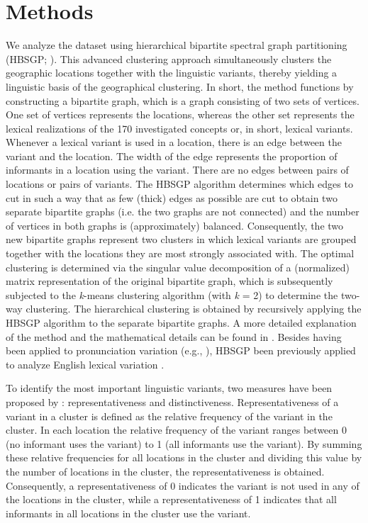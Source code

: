 \documentclass[output=paper]{LSP/langsci}
\begin{document}
\section{Methods}
We analyze the dataset using hierarchical bipartite spectral graph partitioning (HBSGP; \citealt{wieling_bipartite_2011}). This advanced clustering approach simultaneously clusters the geographic locations together with the linguistic variants, thereby yielding a linguistic basis of the geographical clustering. In short, the method functions by constructing a bipartite graph, which is a graph consisting of two sets of vertices. One set of vertices represents the locations, whereas the other set represents the lexical realizations of the 170 investigated concepts or, in short, lexical variants. Whenever a lexical variant is used in a location, there is an edge between the variant and the location. The width of the edge represents the proportion of informants in a location using the variant. There are no edges between pairs of locations or pairs of variants. The HBSGP  algorithm determines which edges to cut in such a way that as few (thick) edges as possible are cut to obtain two separate bipartite graphs (i.e. the two graphs are not connected) and the number of vertices in both graphs is (approximately) balanced. Consequently, the two new bipartite graphs represent two clusters in which lexical variants are grouped together with the locations they are most strongly associated with. The optimal clustering is determined via the singular value decomposition of a (normalized) matrix representation of the original bipartite graph, which is subsequently subjected to the \textit{k}{}-means clustering algorithm (with \textit{k} = 2) to determine the two-way clustering. The hierarchical clustering is obtained by recursively applying the HBSGP algorithm to the separate bipartite graphs. A more detailed explanation of the method and the mathematical details can be found in \citet{wieling_bipartite_2011}. Besides having been applied to pronunciation variation (e.g., \citealt{wieling_bipartite_2011}), HBSGP been previously applied to analyze English lexical variation \citep{wieling_analyzing_2014}. 

To identify the most important linguistic variants, two measures have been proposed by \citet{wieling_bipartite_2011}: representativeness and distinctiveness. Representativeness of a variant in a cluster is defined as the relative frequency of the variant in the cluster. In each location the relative frequency of the variant ranges between 0 (no informant uses the variant) to 1 (all informants use the variant). By summing these relative frequencies for all locations in the cluster and dividing this value by the number of locations in the cluster, the representativeness is obtained. Consequently, a representativeness of 0 indicates the variant is not used in any of the locations in the cluster, while a representativeness of 1 indicates that all informants in all locations in the cluster use the variant. 
\end{document}

